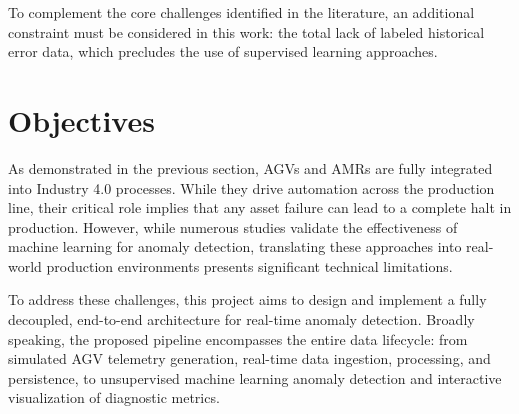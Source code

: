 To complement the core challenges identified in the literature, an additional constraint must be considered in this work: the total lack of labeled historical error data, which precludes the use of supervised learning approaches.\\

\section{Objectives}
As demonstrated in the previous section, AGVs and AMRs are fully integrated into Industry 4.0 processes. While they drive automation across the production line, their critical role implies that any asset failure can lead to a complete halt in production.
However, while numerous studies validate the effectiveness of machine learning for anomaly detection, translating these approaches into real-world production environments presents significant technical limitations.

To address these challenges, this project aims to design and implement a fully decoupled, end-to-end architecture for real-time anomaly detection. Broadly speaking, the proposed pipeline encompasses the entire data lifecycle: from simulated AGV telemetry generation, real-time data ingestion, processing, and persistence, to unsupervised machine learning anomaly detection and interactive visualization of diagnostic metrics.

